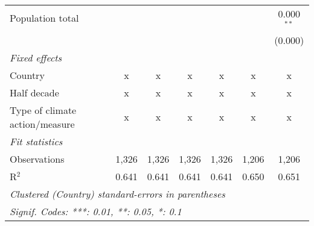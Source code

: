 \begin{tabular}{lcccccc}
   Population total                             &         &         &         &         &         & 0.000$^{**}$\\   
                                                &         &         &         &         &         & (0.000)\\   
   \emph{Fixed effects}\\
   Country                                      & x       & x       & x       & x       & x       & x\\  
   Half decade                                  & x       & x       & x       & x       & x       & x\\  
   Type of climate action/measure               & x       & x       & x       & x       & x       & x\\  
   \midrule \emph{Fit statistics}\\
   Observations                                 & 1,326   & 1,326   & 1,326   & 1,326   & 1,206   & 1,206\\  
   R$^2$                                        & 0.641   & 0.641   & 0.641   & 0.641   & 0.650   & 0.651\\  
   \midrule
   \multicolumn{7}{l}{\emph{Clustered (Country) standard-errors in parentheses}}\\
   \multicolumn{7}{l}{\emph{Signif. Codes: ***: 0.01, **: 0.05, *: 0.1}}\\
\end{tabular}
\par\endgroup


